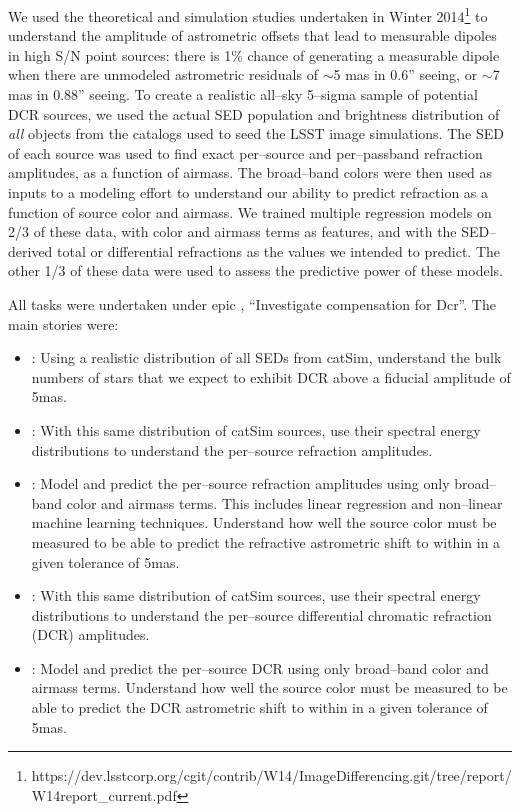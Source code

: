 \documentclass[DM,toc]{lsstdoc}
\begin{document}
We used the theoretical and simulation studies undertaken in Winter
2014\footnote{https://dev.lsstcorp.org/cgit/contrib/W14/ImageDifferencing.git/tree/report/W14report\_current.pdf}
to understand the amplitude of astrometric offsets that lead to
measurable dipoles in high S/N point sources: there is 1\% chance of
generating a measurable dipole when there are unmodeled astrometric
residuals of $\sim$5 mas in 0.6'' seeing, or $\sim$7 mas in 0.88''
seeing.  To create a realistic all--sky 5--sigma sample of potential
DCR sources, we used the actual SED population and brightness
distribution of {\it all} objects from the catalogs used to seed the
LSST image simulations.  The SED of each source was used to find exact
per--source and per--passband refraction amplitudes, as a function of
airmass.  The broad--band colors were then used as inputs to a
modeling effort to understand our ability to predict refraction as a
function of source color and airmass.  We trained multiple regression
models on 2/3 of these data, with color and airmass terms as features,
and with the SED--derived total or differential refractions as the
values we intended to predict.  The other 1/3 of these data were used
to assess the predictive power of these models.

All tasks were undertaken under epic , ``Investigate
compensation for Dcr''.  The main stories were:

\begin{itemize}

\item {}: Using a realistic distribution of all SEDs from
  catSim, understand the bulk numbers of stars that we expect to
  exhibit DCR above a fiducial amplitude of 5mas.

\item {}: With this same distribution of catSim sources, use
  their spectral energy distributions to understand the per--source
  refraction amplitudes.

\item {}: Model and predict the per--source refraction
  amplitudes using only broad--band color and airmass terms.  This
  includes linear regression and non--linear machine learning
  techniques.  Understand how well the source color must be measured
  to be able to predict the refractive astrometric shift to within in
  a given tolerance of 5mas.

\item {}: With this same distribution of catSim sources, use
  their spectral energy distributions to understand the per--source
  differential chromatic refraction (DCR) amplitudes.

\item {}: Model and predict the per--source DCR using only
  broad--band color and airmass terms.  Understand how well the source
  color must be measured to be able to predict the DCR astrometric
  shift to within in a given tolerance of 5mas.

\end{itemize}
\end{document}
